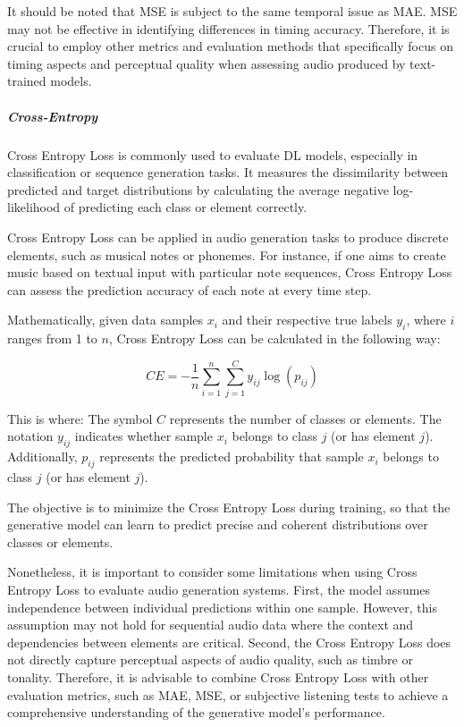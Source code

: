 It should be noted that \ac{MSE} is subject to the same temporal issue as \ac{MAE}. \Ac{MSE} may not be effective in identifying differences in timing accuracy. Therefore, it is crucial to employ other metrics and evaluation methods that specifically focus on timing aspects and perceptual quality when assessing audio produced by text-trained models.

\subparagraph{Cross-Entropy} \label{sec:cross-entropy}

Cross Entropy Loss is commonly used to evaluate \ac{DL} models, especially in classification or sequence generation tasks. It measures the dissimilarity between predicted and target distributions by calculating the average negative log-likelihood of predicting each class or element correctly.

Cross Entropy Loss can be applied in audio generation tasks to produce discrete elements, such as musical notes or phonemes. For instance, if one aims to create music based on textual input with particular note sequences, Cross Entropy Loss can assess the prediction accuracy of each note at every time step.

Mathematically, given data samples $x_i$ and their respective true labels $y_i$, where $i$ ranges from 1 to $n$, Cross Entropy Loss can be calculated in the following way:

\begin{equation}
    CE = -\frac{1}{n}\sum_{i=1}^{n} \sum_{j=1}^{C} y_{ij}\log(p_{ij})
\end{equation}

This is where:
The symbol $C$ represents the number of classes or elements.
The notation $y_{ij}$ indicates whether sample $x_i$ belongs to class $j$ (or has element $j$).
Additionally, $p_{ij}$ represents the predicted probability that sample $x_i$ belongs to class $j$ (or has element $j$).

The objective is to minimize the Cross Entropy Loss during training, so that the generative model can learn to predict precise and coherent distributions over classes or elements.

Nonetheless, it is important to consider some limitations when using Cross Entropy Loss to evaluate audio generation systems. First, the model assumes independence between individual predictions within one sample. However, this assumption may not hold for sequential audio data where the context and dependencies between elements are critical. Second, the Cross Entropy Loss does not directly capture perceptual aspects of audio quality, such as timbre or tonality. Therefore, it is advisable to combine Cross Entropy Loss with other evaluation metrics, such as \ac{MAE}, \ac{MSE}, or subjective listening tests to achieve a comprehensive understanding of the generative model's performance.


